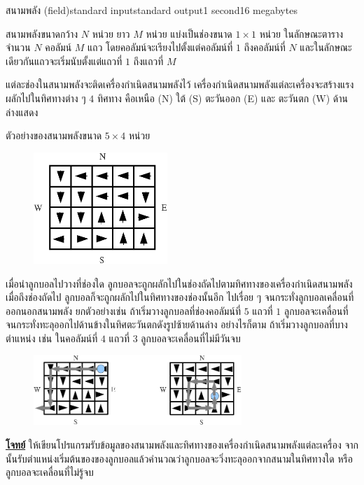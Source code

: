 \documentclass[11pt,a4paper]{article}
\begin{document}
\begin{problem}{สนามพลัง (field)}{standard input}{standard output}{1 second}{16 megabytes}

  สนามพลังขนาดกว้าง $N$ หน่วย ยาว $M$ หน่วย แบ่งเป็นช่องขนาด $1 \times 1$ หน่วย ในลักษณะตารางจำนวน $N$ คอลัมน์ $M$ แถว โดยคอลัมน์จะเรียงไปตั้งแต่คอลัมน์ที่ $1$ ถึงคอลัมน์ที่ $N$ และในลักษณะเดียวกันแถวจะเริ่มนับตั้งแต่แถวที่ $1$ ถึงแถวที่ $M$

                แต่ละช่องในสนามพลังจะติดเครื่องกำเนิดสนามพลังไว้ เครื่องกำเนิดสนามพลังแต่ละเครื่องจะสร้างแรงผลักไปในทิศทางต่าง ๆ $4$ ทิศทาง คือเหนือ (N) ใต้ (S) ตะวันออก (E) และ ตะวันตก (W) ด้านล่างแสดง

ตัวอย่างของสนามพลังขนาด $5 \times 4$ หน่วย

\begin{figure}[h!]
\centering
\includegraphics[width=0.45\textwidth]{../latex/img/1067/1067-1.png}
\end{figure}


เมื่อนำลูกบอลไปวางที่ช่องใด ลูกบอลจะถูกผลักไปในช่องถัดไปตามทิศทางของเครื่องกำเนิดสนามพลัง เมื่อถึงช่องถัดไป ลูกบอลก็จะถูกผลักไปในทิศทางของช่องนั้นอีก ไปเรื่อย ๆ จนกระทั่งลูกบอลเคลื่อนที่ออกนอกสนามพลัง ยกตัวอย่างเช่น ถ้าเริ่มวางลูกบอลที่ช่องคอลัมน์ที่ $5$ แถวที่ $1$ ลูกบอลจะเคลื่อนที่จนกระทั่งทะลุออกไปด้านข้างในทิศตะวันตกดังรูปซ้ายด้านล่าง อย่างไรก็ตาม ถ้าเริ่มวางลูกบอลที่บางตำแหน่ง เช่น ในคอลัมน์ที่ $4$ แถวที่ $3$ ลูกบอลจะเคลื่อนที่ไม่มีวันจบ


\begin{figure}[h!]
\centering
\includegraphics[width=0.7\textwidth]{../latex/img/1067/1067-2.png}
\end{figure}


\bigskip
\underline{\textbf{โจทย์}}  ให้เขียนโปรแกรมรับข้อมูลของสนามพลังและทิศทางของเครื่องกำเนิดสนามพลังแต่ละเครื่อง จากนั้นรับตำแหน่งเริ่มต้นของของลูกบอลแล้วคำนวณว่าลูกบอลจะวิ่งทะลุออกจากสนามในทิศทางใด หรือลูกบอลจะเคลื่อนที่ไม่รู้จบ


\end{problem}
\end{document}
